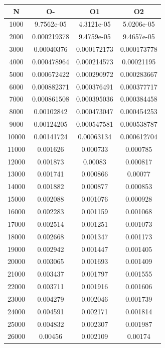 \begin{center}
\begin{tabular}{| c | c | c | c |}
\hline
\textbf{N} & \textbf{O-} & \textbf{O1} & \textbf{O2} \\ \hline
1000 & 9.7562e-05 & 4.3121e-05 & 5.0206e-05 \\ \hline
2000 & 0.000219378 & 9.4759e-05 & 9.4657e-05 \\ \hline
3000 & 0.00040376 & 0.000172173 & 0.000173778 \\ \hline
4000 & 0.000478964 & 0.000214573 & 0.00021195 \\ \hline
5000 & 0.000672422 & 0.000290972 & 0.000283667 \\ \hline
6000 & 0.000882371 & 0.000376491 & 0.000377717 \\ \hline
7000 & 0.000861508 & 0.000395036 & 0.000384458 \\ \hline
8000 & 0.00102842 & 0.000473047 & 0.000454253 \\ \hline
9000 & 0.00124205 & 0.000547581 & 0.000538787 \\ \hline
10000 & 0.00141724 & 0.00063134 & 0.000612704 \\ \hline
11000 & 0.001626 & 0.000733 & 0.000785 \\ \hline
12000 & 0.001873 & 0.00083 & 0.000817 \\ \hline
13000 & 0.001741 & 0.000866 & 0.00077 \\ \hline
14000 & 0.001882 & 0.000877 & 0.000853 \\ \hline
15000 & 0.002088 & 0.001076 & 0.000928 \\ \hline
16000 & 0.002283 & 0.001159 & 0.001068 \\ \hline
17000 & 0.002514 & 0.001251 & 0.001073 \\ \hline
18000 & 0.002668 & 0.001347 & 0.001173 \\ \hline
19000 & 0.002942 & 0.001447 & 0.001405 \\ \hline
20000 & 0.003065 & 0.001693 & 0.001409 \\ \hline
21000 & 0.003437 & 0.001797 & 0.001555 \\ \hline
22000 & 0.003711 & 0.001916 & 0.001606 \\ \hline
23000 & 0.004279 & 0.002046 & 0.001739 \\ \hline
24000 & 0.004591 & 0.002171 & 0.001814 \\ \hline
25000 & 0.004832 & 0.002307 & 0.001987 \\ \hline
26000 & 0.00456 & 0.002109 & 0.00174 \\ \hline

\end{tabular}
\end{center}

